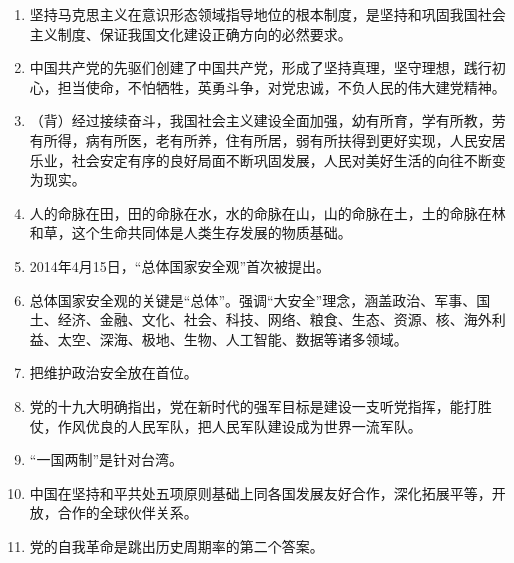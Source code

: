 \documentclass[12pt, a4paper, oneside]{ctexbook}
\begin{document}
\begin{enumerate}
\item 坚持马克思主义在意识形态领域指导地位的根本制度，是坚持和巩固我国社会主义制度、保证我国文化建设正确方向的必然要求。
\item 中国共产党的先驱们创建了中国共产党，形成了坚持真理，坚守理想，践行初心，担当使命，不怕牺牲，英勇斗争，对党忠诚，不负人民的伟大建党精神。
\item （背）经过接续奋斗，我国社会主义建设全面加强，幼有所育，学有所教，劳有所得，病有所医，老有所养，住有所居，弱有所扶得到更好实现，人民安居乐业，社会安定有序的良好局面不断巩固发展，人民对美好生活的向往不断变为现实。
\item 人的命脉在田，田的命脉在水，水的命脉在山，山的命脉在土，土的命脉在林和草，这个生命共同体是人类生存发展的物质基础。
\item 2014年4月15日，“总体国家安全观”首次被提出。
\item 总体国家安全观的关键是“总体”。强调“大安全”理念，涵盖政治、军事、国土、经济、金融、文化、社会、科技、网络、粮食、生态、资源、核、海外利益、太空、深海、极地、生物、人工智能、数据等诸多领域。
\item 把维护政治安全放在首位。
\item 党的十九大明确指出，党在新时代的强军目标是建设一支听党指挥，能打胜仗，作风优良的人民军队，把人民军队建设成为世界一流军队。
\item “一国两制”是针对台湾。
\item 中国在坚持和平共处五项原则基础上同各国发展友好合作，深化拓展平等，开放，合作的全球伙伴关系。
\item 党的自我革命是跳出历史周期率的第二个答案。
\end{enumerate}
\end{document}
